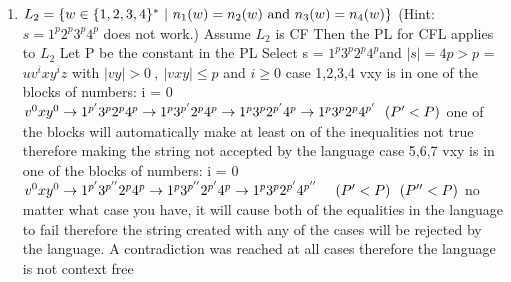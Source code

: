 \documentclass[11pt]{article}
\begin{document}
\begin{enumerate}
\begin{enumerate}
\item $L_2=\{w\in\{1, 2, 3, 4\}^*\ |\ n_1(w) = n_2(w) {\rm\ and\ } n_3(w)=n_4(w)\}$ 
(Hint: $s=1^p2^p3^p4^p$ does not work.)
\newline Assume $L_2$ is CF \newline 
Then the PL for CFL applies to $L_2$ \newline 
Let P be the constant in the PL \newline 
Select s = $1^p3^p2^p4^p$and $|s| = 4p > p$\newline 
= $uv^ixy^iz$ with $|vy| > 0 \ , \ |vxy| \le p $ and $i \ge0$ \newline \newline 
case 1,2,3,4 vxy is in one of the blocks of numbers:\newline 
i = 0 $v^0xy^0 \rightarrow 1^{p'}3^p2^p4^p\newline 
\rightarrow 1^p3^{p'}2^p4^p \newline 
\rightarrow 1^p3^p2^{p'}4^p \newline
\rightarrow 1^p3^p2^p4^{p'} \ \ (P' < P) $ one of the blocks will automatically make at least on of the inequalities not true therefore making the string not accepted by the language \newline \newline 
case 5,6,7 vxy is in one of the blocks of numbers:\newline 
i = 0 $v^0xy^0 \rightarrow 1^{p'}3^{p''}2^p4^p \newline 
\rightarrow 1^p3^{p''}2^{p'}4^p \newline 
\rightarrow 1^p3^p2^{p'}4^{p''}\ \ \ \ (P' < P) \ \ (P'' < P)$ no matter what case you have, it will cause both of the equalities in the language to fail therefore the string created with any of the cases will be rejected by the language. \newline \newline 
A contradiction was reached at all cases therefore the language is not context free



\end{enumerate}
\end{enumerate}
\end{document}

